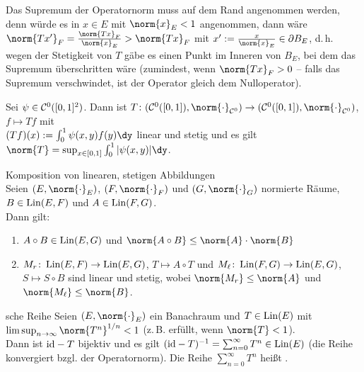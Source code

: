 \begin{Bem}
    Das Supremum der Operatornorm muss auf dem Rand angenommen werden,
    denn würde es in $x \in E$ mit $\norm{x}_E < 1$ angenommen,
    dann wäre $\norm{Tx'}_F = \frac{\norm{Tx}_F}{\norm{x}_E} > \norm{Tx}_F$ mit
    $x' := \frac{x}{\norm{x}_E} \in \partial B_E$,
    d.\,h. wegen der Stetigkeit von $T$ gäbe es einen Punkt im Inneren von $B_E$,
    bei dem das Supremum überschritten wäre
    (zumindest, wenn $\norm{Tx}_F > 0$ -- falls das Supremum verschwindet, ist der
    Operator gleich dem Nulloperator).
\end{Bem}

\begin{Bsp}
    Sei $\psi \in \mathcal{C}^0([0, 1]^2)$.
    Dann ist $T\colon (\C^0([0, 1]), \norm{\cdot}_{\C^0}) \rightarrow
    (\C^0([0, 1]), \norm{\cdot}_{\C^0})$, $f \mapsto Tf$ mit\\
    $(Tf)(x) := \int_0^1 \psi(x, y) f(y)\dy$ linear und stetig und es gilt
    $\norm{T} = \sup_{x \in [0, 1]} \int_0^1 |\psi(x, y)| \dy$.
\end{Bsp}

\linie

\begin{Lemma}{Komposition von linearen, stetigen Abbildungen}\\
    Seien $(E, \norm{\cdot}_E)$, $(F, \norm{\cdot}_F)$ und $(G, \norm{\cdot}_G)$
    normierte Räume,
    $B \in \operatorname{Lin}(E, F)$ und $A \in \operatorname{Lin}(F, G)$.\\
    Dann gilt:
    \begin{enumerate}
        \item
        $A \circ B \in \operatorname{Lin}(E, G)$ und
        $\norm{A \circ B} \le \norm{A} \cdot \norm{B}$
        
        \item
        $M_r\colon \operatorname{Lin}(E, F) \rightarrow \operatorname{Lin}(E, G)$, $T \mapsto A \circ T$ und
        $M_\ell\colon \operatorname{Lin}(F, G) \rightarrow \operatorname{Lin}(E, G)$, $S \mapsto S \circ B$
        sind linear und stetig, wobei
        $\norm{M_r} \le \norm{A}$ und $\norm{M_\ell} \le \norm{B}$.
    \end{enumerate}
\end{Lemma}

\begin{Satz}{sche Reihe}
    Seien $(E, \norm{\cdot}_E)$ ein Banachraum und $T \in \operatorname{Lin}(E)$ mit\\
    $\limsup_{n \to \infty} \norm{T^n}^{1/n} < 1$
    (z.\,B. erfüllt, wenn $\norm{T} < 1$).\\
    Dann ist $\text{id} - T$ bijektiv und es gilt
    $(\text{id} - T)^{-1} = \sum_{n=0}^\infty T^n \in \operatorname{Lin}(E)$
    (die Reihe konvergiert bzgl. der Operatornorm).
    Die Reihe $\sum_{n=0}^\infty T^n$ heißt .
\end{Satz}

